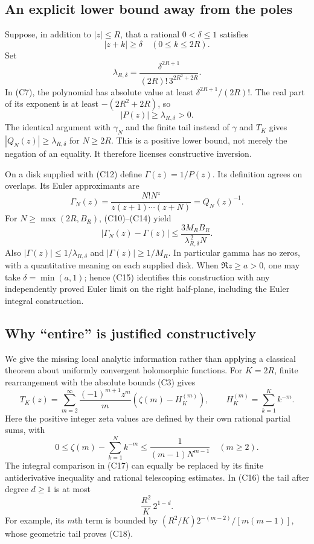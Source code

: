 \subsection{An explicit lower bound away from the poles}
Suppose, in addition to $|z|\leq R$, that a rational $0<\delta\leq1$
satisfies
\[
 |z+k|\geq\delta\quad(0\leq k\leq2R).
 \tag{C12}
\]
Set
\[
 \lambda_{R,\delta}=
 \frac{\delta^{2R+1}}{(2R)!\,3^{2R^2+2R}}.
 \tag{C13}
\]
In (C7), the polynomial has absolute value at least
$\delta^{2R+1}/(2R)!$.  The real part of its exponent is at least
$-(2R^2+2R)$, so
\[
 |P(z)|\geq\lambda_{R,\delta}>0.
 \tag{C14}
\]
The identical argument with $\gamma_N$ and the finite tail instead of
$\gamma$ and $T_K$ gives $|Q_N(z)|\geq\lambda_{R,\delta}$ for
$N\geq2R$.  This is a positive lower bound, not merely the negation of an
equality.  It therefore licenses constructive inversion.

On a disk supplied with (C12) define $\Gamma(z)=1/P(z)$.  Its definition
agrees on overlaps.  Its Euler approximants are
\[
 \Gamma_N(z)=\frac{N!N^z}{z(z+1)\cdots(z+N)}=Q_N(z)^{-1}.
\]
For $N\geq\max(2R,B_R)$, (C10)--(C14) yield
\[
 \boxed{\displaystyle
 |\Gamma_N(z)-\Gamma(z)|
 \leq\frac{3M_RB_R}{\lambda_{R,\delta}^{\,2}N}.}
 \tag{C15}
\]
Also $|\Gamma(z)|\leq1/\lambda_{R,\delta}$ and
$|\Gamma(z)|\geq1/M_R$.  In particular gamma has no zeros, with a
quantitative meaning on each supplied disk.  When $\Re z\geq a>0$,
one may take $\delta=\min(a,1)$; hence (C15) identifies this construction
with any independently proved Euler limit on the right half-plane,
including the Euler integral construction.

\subsection{Why ``entire'' is justified constructively}
We give the missing local analytic information rather than applying a
classical theorem about uniformly convergent holomorphic functions.
For $K=2R$, finite rearrangement with the absolute bounds (C3) gives
\[
 T_K(z)=\sum_{m=2}^{\infty}
 \frac{(-1)^{m+1}z^m}{m}
 \left(\zeta(m)-H_K^{(m)}\right),\qquad
 H_K^{(m)}=\sum_{k=1}^K k^{-m}.
 \tag{C16}
\]
Here the positive integer zeta values are defined by their own rational
partial sums, with
\[
 0\leq\zeta(m)-\sum_{k=1}^N k^{-m}
 \leq\frac{1}{(m-1)N^{m-1}}\quad(m\geq2).
 \tag{C17}
\]
The integral comparison in (C17) can equally be replaced by its finite
antiderivative inequality and rational telescoping estimates.
In (C16) the tail after degree $d\geq1$ is at most
\[
 \frac{R^2}{K}\,2^{1-d}.
 \tag{C18}
\]
For example, its $m$th term is bounded by
$(R^2/K)2^{-(m-2)}/[m(m-1)]$, whose geometric tail proves (C18).

